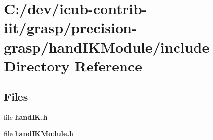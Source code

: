 \section{C\+:/dev/icub-\/contrib-\/iit/grasp/precision-\/grasp/hand\+I\+K\+Module/include Directory Reference}
\label{dir_7c5b62cd255733f2bf7c41890e24dcad}
\subsection*{Files}
\begin{DoxyCompactItemize}
\item 
file {\bfseries hand\+I\+K.\+h}
\item 
file {\bfseries hand\+I\+K\+Module.\+h}
\end{DoxyCompactItemize}
